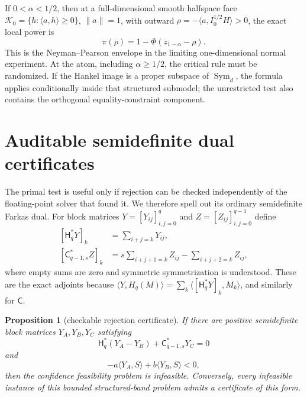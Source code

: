 \documentclass[11pt]{article}
\newtheorem{proposition}[theorem]{Proposition}
\newcommand{\Sym}{\operatorname{Sym}}
\newcommand{\ip}[2]{\langle #1,#2\rangle}
\newcommand{\norm}[1]{\lVert #1\rVert}
\begin{document}
If $0<\alpha<1/2$, then at a full-dimensional smooth halfspace face
$\mathcal K_0=\{h:\ip{a}{h}\ge0\}$, $\norm a=1$, with outward
$\rho=-\ip{a}{I_0^{1/2}H}>0$, the exact local power is
\[
\boxed{\pi(\rho)=1-\Phi(z_{1-\alpha}-\rho).}                       \tag{8.10}
\]
This is the Neyman--Pearson envelope in the limiting one-dimensional normal
experiment.  At the atom, including $\alpha\ge1/2$, the critical rule must be
randomized.  If the Hankel image is a proper subspace of $\Sym_d$, the formula
applies conditionally inside that structured submodel; the unrestricted test
also contains the orthogonal equality-constraint component.

\section{Auditable semidefinite dual certificates}\label{sec:dual}

The primal test is useful only if rejection can be checked independently of
the floating-point solver that found it.  We therefore spell out its ordinary
semidefinite Farkas dual.  For block matrices $Y=[Y_{ij}]_{i,j=0}^q$ and
$Z=[Z_{ij}]_{i,j=0}^{q-1}$ define
\[
 \begin{aligned}
 [\mathsf H_q^*Y]_k&=\sum_{i+j=k}Y_{ij},\\
 [\mathsf C_{q-1,s}^*Z]_k
 &=s\sum_{i+j+1=k}Z_{ij}-\sum_{i+j+2=k}Z_{ij},
 \end{aligned}                                                     \tag{9.1}
\]
where empty sums are zero and symmetric symmetrization is understood.  These
are the exact adjoints because
$\ip{Y}{H_q(M)}=\sum_k\ip{[\mathsf H_q^*Y]_k}{M_k}$, and similarly
for $\mathsf C$.

\begin{proposition}[checkable rejection certificate]\label{prop:dual}
If there are positive semidefinite block matrices $Y_A,Y_B,Y_C$ satisfying
\[
 \mathsf H_q^*(Y_A-Y_B)+\mathsf C_{q-1,s}^*Y_C=0                 \tag{9.2}\label{eq:dualstationarity}
\]
and
\[
 -a\ip{Y_A}{S}+b\ip{Y_B}{S}<0,                                  \tag{9.3}\label{eq:dualobjective}
\]
then the confidence feasibility problem is infeasible.  Conversely, every
infeasible instance of this bounded structured-band problem admits a
certificate of this form.
\end{proposition}
\end{document}
